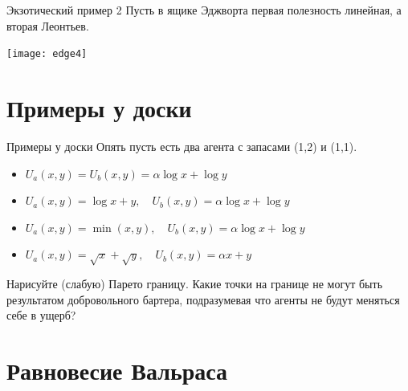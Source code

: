 \documentclass{beamer}
\begin{document}
\begin{frame}{Экзотический пример 2}
Пусть в ящике Эджворта первая полезность линейная, а вторая Леонтьев.

\begin{center}
     \texttt{[image: edge4]}
     \end{center}

\end{frame}

\section{Примеры у доски}

\begin{frame}{Примеры у доски}
Опять пусть есть два агента с запасами (1,2) и (1,1).
\begin{itemize}
  \item $U_a(x,y) = U_b(x,y) = \alpha \log x + \log y$\
  \item $U_a(x,y) = \log x + y, \quad U_b(x,y) = \alpha \log x + \log y $
  \item $U_a(x,y) = \min(x,y), \quad U_b(x,y) = \alpha \log x + \log y $
  \item $U_a(x,y) = \sqrt{x}+ \sqrt{y}, \quad U_b(x,y) = \alpha x + y $
\end{itemize}
Нарисуйте (слабую) Парето границу. Какие точки на границе не могут быть результатом добровольного бартера, подразумевая что агенты не будут меняться себе в ущерб?
\end{frame}

\section{Равновесие Вальраса}
\end{document}
